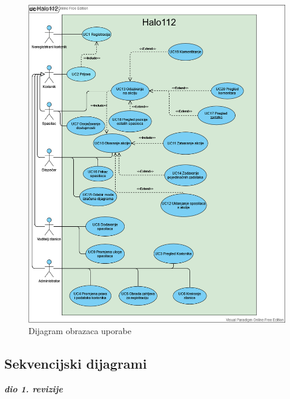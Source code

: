 				\begin{figure}[H]
					\includegraphics[scale=0.5]{slike/usecase.PNG} %
					\centering
					\caption{Dijagram obrazaca uporabe}
					\label{fig:promjene}
				\end{figure}
				\eject		
				
			\subsection{Sekvencijski dijagrami}
				
				\textbf{\textit{dio 1. revizije}}\\
				
